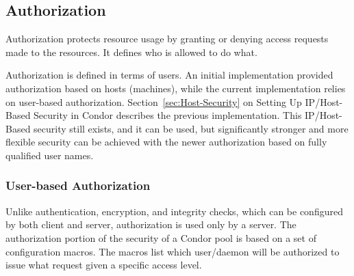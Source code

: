 
\subsection{\label{sec:Security-Authorization} Authorization}

Authorization protects resource usage by granting or denying
access requests made to the resources.
It defines who is allowed to do what.

Authorization is defined in terms of users.
An initial implementation provided authorization
based on hosts (machines), while the current implementation
relies on user-based authorization.
Section~\ref{sec:Host-Security}
on Setting Up IP/Host-Based Security in Condor describes the
previous implementation.
This IP/Host-Based security still exists, and it can be used,
but significantly stronger and more flexible
security can be achieved with the newer
authorization based on fully qualified user names.

\subsubsection{\label{sec:Security-UserAuthorization}User-based Authorization}


Unlike authentication, encryption, and integrity checks,
which can be configured by both client and server,
authorization is used only by a server.
The authorization portion of the security of a Condor pool is
based on a set of configuration macros.
The macros list which user/daemon will be authorized
to issue what request given a specific access level.

